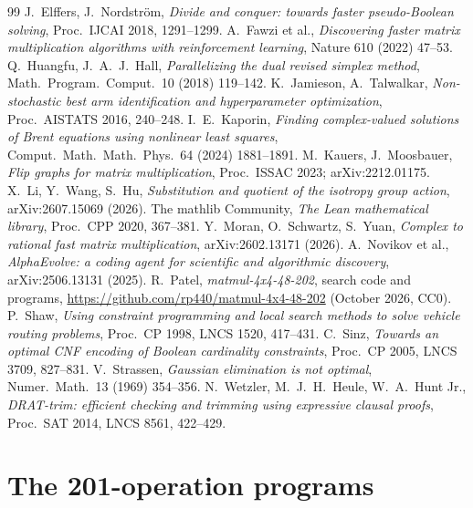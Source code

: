 \documentclass[11pt]{article}
\theoremstyle{remark}
\begin{document}
\begin{thebibliography}{99}
 J.~Elffers, J.~Nordstr\"om, \emph{Divide and
conquer: towards faster pseudo-Boolean solving}, Proc.\ IJCAI 2018,
1291--1299.
 A.~Fawzi et al., \emph{Discovering faster matrix
multiplication algorithms with reinforcement learning}, Nature 610
(2022) 47--53.
 Q.~Huangfu, J.~A.~J.~Hall, \emph{Parallelizing the dual
revised simplex method}, Math.\ Program.\ Comput.\ 10 (2018) 119--142.
 K.~Jamieson, A.~Talwalkar, \emph{Non-stochastic best arm
identification and hyperparameter optimization}, Proc.\ AISTATS 2016,
240--248.
 I.~E.~Kaporin, \emph{Finding complex-valued
solutions of Brent equations using nonlinear least squares}, Comput.\
Math.\ Math.\ Phys.\ 64 (2024) 1881--1891.
 M.~Kauers, J.~Moosbauer, \emph{Flip graphs for matrix
multiplication}, Proc.\ ISSAC 2023; arXiv:2212.01175.
 X.~Li, Y.~Wang, S.~Hu, \emph{Substitution and quotient
of the isotropy group action}, arXiv:2607.15069 (2026).
 The mathlib Community, \emph{The Lean mathematical
library}, Proc.\ CPP 2020, 367--381.
 Y.~Moran, O.~Schwartz, S.~Yuan, \emph{Complex to
rational fast matrix multiplication}, arXiv:2602.13171 (2026).
 A.~Novikov et al., \emph{AlphaEvolve: a coding agent
for scientific and algorithmic discovery}, arXiv:2506.13131 (2025).
\bibitem{Patel26} R.~Patel, \emph{matmul-4x4-48-202}, search code and
programs, \url{https://github.com/rp440/matmul-4x4-48-202} (October
2026, CC0).
 P.~Shaw, \emph{Using constraint programming and local
search methods to solve vehicle routing problems}, Proc.\ CP 1998, LNCS
1520, 417--431.
 C.~Sinz, \emph{Towards an optimal CNF encoding of
Boolean cardinality constraints}, Proc.\ CP 2005, LNCS 3709, 827--831.
\bibitem{Strassen69} V.~Strassen, \emph{Gaussian elimination is not
optimal}, Numer.\ Math.\ 13 (1969) 354--356.
 N.~Wetzler, M.~J.~H.~Heule, W.~A.~Hunt Jr.,
\emph{DRAT-trim: efficient checking and trimming using expressive
clausal proofs}, Proc.\ SAT 2014, LNCS 8561, 422--429.
\end{thebibliography}

\appendix
\section{The 201-operation programs}\label{app:scheme}

\end{document}
